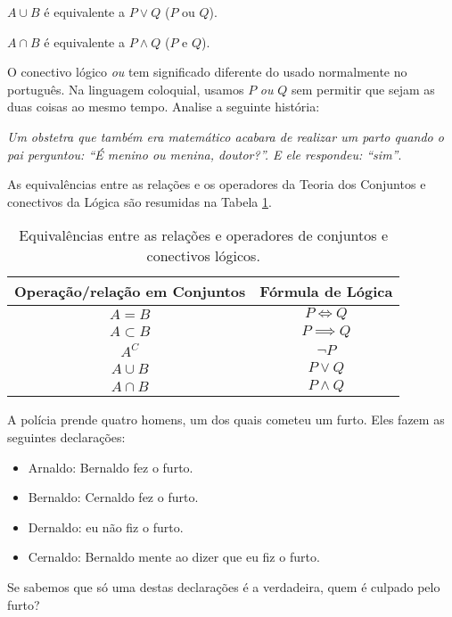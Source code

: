 \begin{equivalence}
$A \cup B$ é equivalente a $P \lor Q$ ($P \text{ ou } Q$).
\end{equivalence}

\begin{equivalence}
$A \cap B$ é equivalente a $P \land Q$ ($P \text{ e } Q$).
\end{equivalence}

\begin{remark}
O conectivo lógico \textit{ou} tem significado diferente do usado normalmente no português. Na linguagem coloquial, usamos $P$ \textit{ou} $Q$ sem permitir que sejam as duas coisas ao mesmo tempo. Analise a seguinte história:\newline

\textit{Um obstetra que também era matemático acabara de realizar um parto quando o pai perguntou: ``É menino ou menina, doutor?''. E ele respondeu: ``sim''}.
\end{remark}

As equivalências entre as relações e os operadores da Teoria dos Conjuntos e conectivos da Lógica são resumidas na Tabela \ref{tbl:equiv-conj-logc}.

\begin{table}[h]
\begin{center}
\caption{Equivalências entre as relações e operadores de conjuntos e conectivos lógicos.}
\label{tbl:equiv-conj-logc}
\begin{tabular}{|c|c|}
	\hline
	Operação/relação em Conjuntos & Fórmula de Lógica \\\hline
	$A=B$ & $P \iff Q$ \\ \hline
	$A \subset B$ & $P \implies Q$ \\ \hline
	$A^C$ & $\neg P$ \\ \hline
	$A \cup B$ & $P \lor Q$ \\ \hline
	$A \cap B$ & $P \land Q$ \\
	\hline
\end{tabular}
\end{center}
\end{table}

\begin{problem}
A polícia prende quatro homens, um dos quais cometeu um furto. Eles fazem as seguintes declarações:
%
\begin{itemize}[leftmargin=*]
  \item Arnaldo: Bernaldo fez o furto.
  \item Bernaldo: Cernaldo fez o furto.
  \item Dernaldo: eu não fiz o furto.
  \item Cernaldo: Bernaldo mente ao dizer que eu fiz o furto.
\end{itemize}
%
Se sabemos que só uma destas declarações é a verdadeira, quem é culpado pelo furto?
\end{problem}
